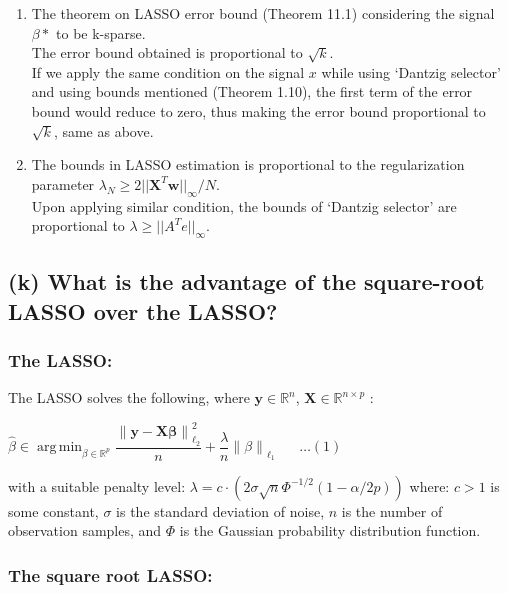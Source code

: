 \documentclass[fleqn, 11pt]{article}
\DeclareMathOperator*{\argmin}{arg\,min}
\newcommand{\bs}[1]{\boldsymbol{#1}}
\newcommand\norm[1]{\left\lVert#1\right\rVert}
\begin{document}
\begin{enumerate}
    \item The theorem on LASSO error bound (Theorem 11.1) considering the signal $\beta*$ to be k-sparse. \\
        The error bound obtained is proportional to $\sqrt{k}$. \\
        If we apply the same condition on the signal $x$ while using `Dantzig selector' and using bounds mentioned (Theorem 1.10), the first term of the error bound would reduce to zero, thus making the error bound proportional to $\sqrt{k}$, same as above.
    \item The bounds in LASSO estimation is proportional to the regularization parameter $\lambda_N \ge 2 ||\mathbf{X}^T \mathbf{w} ||_{\infty}/N$. \\
        Upon applying similar condition, the bounds of `Dantzig selector' are proportional to $\lambda \ge || A^T e ||_{\infty}$.
\end{enumerate}


\bigskip

\newpage
\subsection*{(k) What is the advantage of the square-root LASSO over the LASSO?}

\subsubsection*{The LASSO:}

The LASSO solves the following, where $ \bs{y} \in \mathbb{R}^n$, $ \bs{X} \in \mathbb{R}^{n \times p} $ :

\begin{center}
    
$\hat{\beta} \in \displaystyle 
\argmin_{\beta \in \mathbb{R}^p} \dfrac{\norm{\bs{y-X \beta}}_{\ell_2}^2}{n}
+ \dfrac{\lambda}{n} \norm{\beta}_{\ell_1} \hspace{20pt}\ldots(1) $   

\end{center}

with a suitable penalty level: $\lambda = c \cdot ( 2 \sigma \sqrt{n} \Phi^{-1/2}(1-\alpha / 2p) ) $
where: 
$c>1$ is some constant, $\sigma$ is the standard deviation of noise, $n$ is the number of observation samples, 
and $\Phi$ is the Gaussian probability distribution function.

\subsubsection*{The square root LASSO:}
\end{document}
